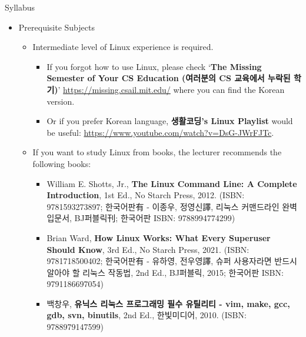 \begin{frame}{Syllabus}
  \begin{itemize}
  \item Prerequisite Subjects
    \begin{itemize}
      \item Intermediate level of Linux experience is required.
      \begin{itemize}
        \item If you forgot how to use Linux, please check `\textbf{The Missing Semester of Your CS Education (여러분의 CS 교육에서 누락된 학기)}' \url{https://missing.csail.mit.edu/} where you can find the Korean version.
        \item Or if you prefer Korean language, \textbf{생활코딩's Linux Playlist} would be useful: \url{https://www.youtube.com/watch?v=DsG-JWrFJTc}.
      \end{itemize}       
      \item If you want to study Linux from books, the lecturer recommends the following books:
        \begin{itemize}
          \item William E. Shotts, Jr., \textbf{The Linux Command Line: A Complete Introduction}, 1st Ed., No Starch Press, 2012. (ISBN: 9781593273897; 한국어판有 - 이종우, 정영신譯, 리눅스 커맨드라인 완벽 입문서, BJ퍼블릭刊; 한국어판 ISBN: 9788994774299)
          \item Brian Ward, \textbf{How Linux Works: What Every Superuser Should Know}, 3rd Ed., No Starch Press, 2021. (ISBN: 9781718500402; 한국어판有 - 유하영, 전우영譯, 슈퍼 사용자라면 반드시 알아야 할 리눅스 작동법, 2nd Ed., BJ퍼블릭, 2015; 한국어판 ISBN: 9791186697054)
          \item 백창우, \textbf{유닉스 리눅스 프로그래밍 필수 유틸리티 - vim, make, gcc, gdb, svn, binutils}, 2nd Ed., 한빛미디어, 2010. (ISBN: 9788979147599)
        \end{itemize}
    \end{itemize}
  \end{itemize}
\end{frame}


